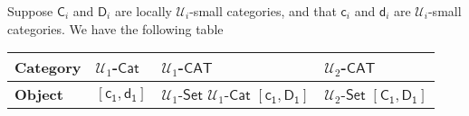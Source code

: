 \documentclass{report}
\begin{document}
Suppose $\mathsf{C}_i$ and $\mathsf{D}_i$ are locally $\mathscr{U}_i$-small categories, and that $\mathsf{c}_i$ and $\mathsf{d}_i$ are $\mathscr{U}_i$-small categories. We have the following table
\begin{table}[h]
    \centering
    \begin{tabular}{P{2cm}|P{2cm}|P{2cm}|P{2cm}}
        \toprule
        \textbf{Category}&$\mathscr{U}_1$-$\mathsf{Cat}$ & $\mathscr{U}_1$-$\mathsf{CAT}$ & $\mathscr{U}_2$-$\mathsf{CAT}$ \\
        \midrule
        \midrule
        \textbf{Object}&$ [\mathsf{c_1},\mathsf{d_1}]$& $\mathscr{U}_1$-$\mathsf{Set}$ $\mathscr{U}_1$-$\mathsf{Cat}$ $[\mathsf{c_1},\mathsf{D_1}]$& $\mathscr{U}_2$-$\mathsf{Set}$ $[\mathsf{C_1},\mathsf{D_1}]$ \\ \bottomrule
    \end{tabular}
\end{table}
\end{document}
